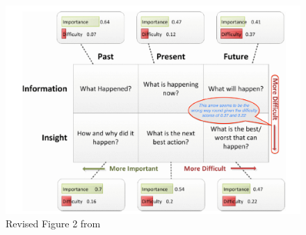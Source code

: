\begin{figure}
    \centering
    \includegraphics[width=\linewidth]{images/related-work/buse2012-edited-figure-2.pdf}
    \caption{Revised Figure 2 from \cite{buse2012_information_needs_for_software_development_analytics}}
    \label{fig:buse2012-edited-figure-2}
\end{figure}


